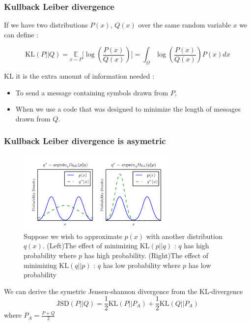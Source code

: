 \documentclass[french,9pt]{beamer}
\begin{document}
\begin{frame}
\frametitle{Kullback Leiber divergence}

If we have two distributions $P(x)$, $Q(x)$ over the same random variable $x$ we can define :

\begin{equation}
\label{kldiv}
\text{KL}(P||Q)=\underset{x \sim P}{\mathbb{E}}\big[\log(\frac{P(x)}{Q(x)})\big]=\int_{\Omega} \log(\frac{P(x)}{Q(x)}) P(x) dx
\end{equation}

KL it is the extra amount of information needed :

\begin{itemize}
\item To send a message containing symbols drawn from $P$,
\item When we use a code that was designed to minimize the length of messages drawn from $Q$.
\end{itemize}
  

\end{frame}

\begin{frame}
\frametitle{Kullback Leiber divergence is asymetric}

\begin{figure}
  \begin{center}
    \includegraphics[width=0.7\textwidth]{fig/asymkl.png}
  \end{center}
  \caption{{\small Suppose we wish to approximate $p(x)$ with another distribution $q(x)$. (Left)The effect of minimizing $\text{KL}(p||q)$ : $q$ has high probability where $p$ has high probability. (Right)The effect of minimizing $\text{KL}(q||p)$ : $q$ has low probability where $p$ has low probability \cite{DBLP:journals/nature/LeCunBH15}}}
\end{figure}

We can derive the symetric Jensen-shannon divergence from the KL-divergence 
\begin{equation}
\label{kldiv}
\text{JSD}(P||Q)=\frac{1}{2} \text{KL}(P||P_{A}) + \frac{1}{2} \text{KL}(Q||P_{A})
\end{equation}
where $P_{A}=\frac{P+Q}{2}$
 
\end{frame}
\end{document}
